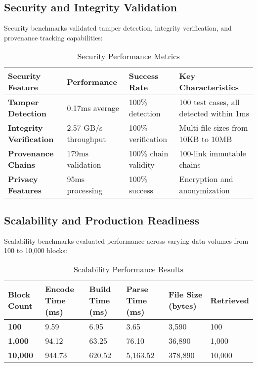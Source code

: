 \documentclass[conference]{IEEEtran}
\begin{document}
\subsection{Security and Integrity Validation}

Security benchmarks validated tamper detection, integrity verification, and provenance tracking capabilities:

\begin{table*}[!t]
\renewcommand{\arraystretch}{1.3}
\caption{Security Performance Metrics}
\label{tab:security-metrics}
\centering
\footnotesize
\begin{tabular}{p{4cm}p{3cm}p{3cm}p{4cm}}
\toprule
\textbf{Security Feature} & \textbf{Performance} & \textbf{Success Rate} & \textbf{Key Characteristics} \\
\midrule
\textbf{Tamper Detection} & 0.17ms average & 100\% detection & 100 test cases, all detected within 1ms \\
\textbf{Integrity Verification} & 2.57 GB/s throughput & 100\% verification & Multi-file sizes from 10KB to 10MB \\
\textbf{Provenance Chains} & 179ms validation & 100\% chain validity & 100-link immutable chains \\
\textbf{Privacy Features} & 95ms processing & 100\% success & Encryption and anonymization \\
\bottomrule
\end{tabular}
\end{table*}

\subsection{Scalability and Production Readiness}

Scalability benchmarks evaluated performance across varying data volumes from 100 to 10,000 blocks:

\begin{table*}[!t]
\renewcommand{\arraystretch}{1.3}
\caption{Scalability Performance Results}
\label{tab:scalability-results}
\centering
\footnotesize
\begin{tabular}{p{2cm}p{2.5cm}p{2.5cm}p{2.5cm}p{2.5cm}p{2cm}}
\toprule
\textbf{Block Count} & \textbf{Encode Time (ms)} & \textbf{Build Time (ms)} & \textbf{Parse Time (ms)} & \textbf{File Size (bytes)} & \textbf{Retrieved} \\
\midrule
\textbf{100} & 9.59 & 6.95 & 3.65 & 3,590 & 100 \\
\textbf{1,000} & 94.12 & 63.25 & 76.10 & 36,890 & 1,000 \\
\textbf{10,000} & 944.73 & 620.52 & 5,163.52 & 378,890 & 10,000 \\
\bottomrule
\end{tabular}
\end{table*}
\end{document}
